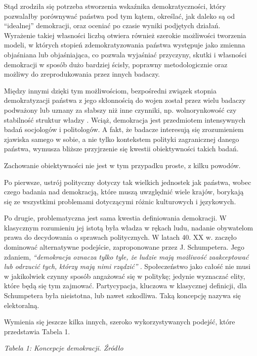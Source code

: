 \documentclass[12pt]{article}
\begin{document}
Stąd zrodziła się potrzeba stworzenia wskaźnika demokratyczności, który pozwalałby porównywać państwa pod tym kątem, określać, jak daleko są od ``idealnej'' demokracji, oraz oceniać po czasie wyniki podjętych działań. Wyrażenie takiej własności liczbą otwiera również szerokie możliwości tworzenia modeli, w których stopień zdemokratyzowania państwa występuje jako zmienna objaśniana lub objaśniająca, co pozwala wyjaśniać przyczyny, skutki i własności demokracji w sposób dużo bardziej ścisły, poprawny metodologicznie oraz możliwy do zreprodukowania przez innych badaczy.

Między innymi dzięki tym możliwościom, bezpośredni związek stopnia demokratyzacji państwa z jego skłonnością do wojen został przez wielu badaczy podważony lub uznany za słabszy niż inne czynniki, np. wolnorynkowość czy stabilność struktur władzy \citep{Doorenspleet}. Wciąż, demokracja jest przedmiotem intensywnych badań socjologów i politologów. A fakt, że badacze interesują się zrozumieniem zjawiska samego w sobie, a nie tylko kontekstem polityki zagranicznej danego państwa, wymusza bliższe przyjrzenie się kwestii obiektywności takich badań.

Zachowanie obiektywności nie jest w tym przypadku proste, z kilku powodów.

Po pierwsze, ustrój polityczny dotyczy tak wielkich jednostek jak państwa, wobec czego badania nad demokracją, które muszą uwzględnić wiele krajów, borykają się ze wszystkimi problemami dotyczącymi różnic kulturowych i językowych.

Po drugie, problematyczna jest sama kwestia definiowania demokracji. W klasycznym rozumieniu jej istotą była władza w rękach ludu, nadanie obywatelom prawa do decydowania o sprawach politycznych. W latach 40. XX w. zaczęło dominować alternatywne podejście, zaproponowane przez J. Schumpetera. Jego zdaniem, \emph{``demokracja oznacza tylko tyle, że ludzie mają możliwość zaakceptować lub odrzucić tych, którzy mają nimi rządzić''} \citep{Schumpeter}. Społeczeństwo jako całość nie musi w jakikolwiek czynny sposób angażować się w politykę; jedynie wyznaczać elity, które będą się tym zajmować. Partycypacja, kluczowa w klasycznej definicji, dla Schumpetera była nieistotna, lub nawet szkodliwa. Taką koncepcję nazywa się elektoralną.

Wymienia się jeszcze kilka innych, szeroko wykorzystywanych podejść, które przedstawia Tabela 1.

\emph{Tabela 1: Koncepcje demokracji. Źródło \citep{Coppedge}}
\end{document}
